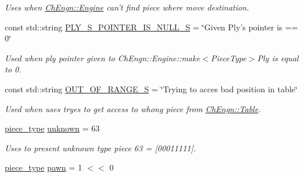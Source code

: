 \begin{DoxyCompactItemize}
\begin{DoxyCompactList}\small\item\em Uses when \hyperlink{classChEngn_1_1Engine}{ChEngn::Engine} can't find piece where move destination. \item\end{DoxyCompactList}\item 
\hypertarget{namespaceChEngn_afbdf882021d19396728801e116518dac}{
const std::string \hyperlink{namespaceChEngn_afbdf882021d19396728801e116518dac}{PLY\_\-S\_\-POINTER\_\-IS\_\-NULL\_\-S} = \char`\"{}Given Ply's pointer is == 0\char`\"{}}
\label{namespaceChEngn_afbdf882021d19396728801e116518dac}

\begin{DoxyCompactList}\small\item\em Used when ply pointer given to ChEngn::Engine::make$<$PieceType$>$Ply is equal to 0. \item\end{DoxyCompactList}\item 
\hypertarget{namespaceChEngn_a0c588cbbd7367bc19a844ea5966686f5}{
const std::string \hyperlink{namespaceChEngn_a0c588cbbd7367bc19a844ea5966686f5}{OUT\_\-OF\_\-RANGE\_\-S} = \char`\"{}Trying to acces bad position in table\char`\"{}}
\label{namespaceChEngn_a0c588cbbd7367bc19a844ea5966686f5}

\begin{DoxyCompactList}\small\item\em Used when uses tryes to get access to whong piece from \hyperlink{classChEngn_1_1Table}{ChEngn::Table}. \item\end{DoxyCompactList}\item 
\hypertarget{namespaceChEngn_a538ef441c024a7e5d4c1dedb5e03fc21}{
\hyperlink{namespaceChEngn_a2a35c185f259757a78e937575b8ed483}{piece\_\-type} \hyperlink{namespaceChEngn_a538ef441c024a7e5d4c1dedb5e03fc21}{unknown} = 63}
\label{namespaceChEngn_a538ef441c024a7e5d4c1dedb5e03fc21}

\begin{DoxyCompactList}\small\item\em Uses to present unknown type piece 63 = \mbox{[}00011111\mbox{]}. \item\end{DoxyCompactList}\item 
\hypertarget{namespaceChEngn_af4781da8088272ec86e35be681dde106}{
\hyperlink{namespaceChEngn_a2a35c185f259757a78e937575b8ed483}{piece\_\-type} \hyperlink{namespaceChEngn_af4781da8088272ec86e35be681dde106}{pawn} = 1 $<$$<$ 0}
\label{namespaceChEngn_af4781da8088272ec86e35be681dde106}


\end{DoxyCompactItemize}
